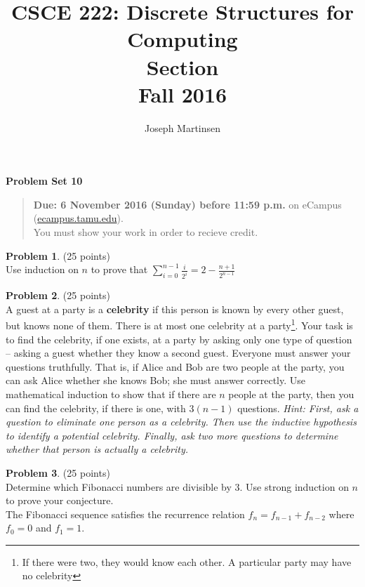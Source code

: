 \documentclass{article}
\title{CSCE 222: Discrete Structures for Computing\\Section \mysectionnumber\\Fall 2016}
\author{Joseph Martinsen}
\theoremstyle{definition}
\newtheorem{problem}{Problem}
\newtheorem*{solution}{Solution}
\newcommand{\problemset}[1]{\begin{center}\textbf{Problem Set #1}\end{center}}
\newcommand{\duedate}[1]{\begin{quote}\textbf{Due: #1} on eCampus (\url{ecampus.tamu.edu}). \\You must show your work in order to recieve credit.\end{quote}}
\begin{document}
\maketitle

\problemset{10}

\duedate{6 November 2016 (Sunday) before 11:59 p.m.}

\bigskip

\begin{problem} (25 points)\\
Use  induction on $n$ to prove that $\displaystyle \sum_{i=0}^{n-1} \frac{i}{2^i} = 2-\frac{n+1}{2^{n-1}}$
\end{problem}



\begin{problem} (25 points)\\
A guest at a party is a \textbf{celebrity} if this person is known by every other guest, but knows none of them. 
There is at most one celebrity at a party\footnote{If there were two, they
would know each other. A particular party may have no celebrity}. 
Your task is to find the celebrity, if one exists, at a party by asking only one type of question --
asking a guest whether they know a second guest.
Everyone must answer your questions truthfully.
That is, if Alice and Bob are two people at the party, you can ask Alice whether she knows Bob; 
she must answer correctly.
Use mathematical induction to show that if there are $n$ people at the party, then you can find the celebrity, if there is one, with $3(n-1)$ questions. 
\textit{Hint: First, ask a question to eliminate one person as a celebrity. 
Then use the inductive hypothesis to identify a potential celebrity.
Finally, ask two more questions to determine whether that person is actually a celebrity.} 
\end{problem}



\begin{problem} (25 points)\\
Determine which Fibonacci numbers are divisible by 3. Use strong induction on $n$ to prove your conjecture.\\
The Fibonacci sequence satisfies the recurrence relation $f_n = f_{n-1} + f_{n-2}$ where $f_0 = 0$ and $f_1 = 1$.
\end{problem}
\end{document}

